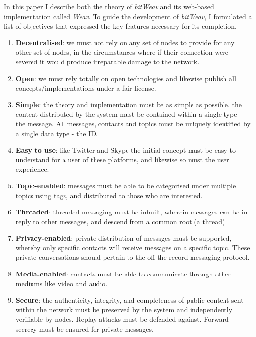 \documentclass[10pt,a4paper,onecolumn]{article}
\begin{document}
In this paper I describe both the theory of \textit{bitWeav} and its web-based implementation called \textit{Weav}. To guide the development of \textit{bitWeav}, I formulated a list of objectives that expressed the key features necessary for its completion.
\begin{enumerate}
\item \textbf{Decentralised}: we must not rely on any set of nodes to provide for any other set of nodes, in the circumstances where if their connection were severed it would produce irreparable damage to the network. 

\item \textbf{Open}: we must rely totally on open technologies and likewise publish all concepts/implementations under a fair license.

\item \textbf{Simple}: the theory and implementation must be as simple as possible. the content distributed by the system must be contained within a single type - the message. All messages, contacts and topics must be uniquely identified by a single data type - the ID.

\item \textbf{Easy to use}: like Twitter and Skype the initial concept must be easy to understand for a user of these platforms, and likewise so must the user experience.

\item \textbf{Topic-enabled}: messages must be able to be categorised under multiple topics using tags, and distributed to those who are interested.

\item \textbf{Threaded}: threaded messaging must be inbuilt, wherein messages can be in reply to other messages, and descend from a common root (a thread)

\item \textbf{Privacy-enabled}: private distribution of messages must be supported, whereby only specific contacts will receive messages on a specific topic. These private conversations should pertain to the off-the-record messaging protocol. 

\item \textbf{Media-enabled}: contacts must be able to communicate through other mediums like video and audio. 

\item \textbf{Secure}: the authenticity, integrity, and completeness of public content sent within the network must be preserved by the system and independently verifiable by nodes. Replay attacks must be defended against. Forward secrecy must be ensured for private messages.
\end{enumerate}
\end{document}
